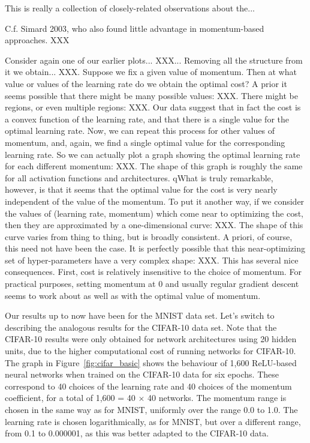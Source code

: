 \documentclass[10pt]{article}
\begin{document}
This is really a collection of closely-related
observations about the...


C.f.  Simard 2003, who also found little advantage in momentum-based
approaches. XXX

Consider again one of our earlier plots... XXX... Removing all the
structure from it we obtain... XXX.  Suppose we fix a given value of
momentum.  Then at what value or values of the learning rate do we
obtain the optimal cost?  A prior it seems possible that there might
be many possible values: XXX.  There might be regions, or even
multiple regions: XXX.  Our data suggest that in fact the cost is a
convex function of the learning rate, and that there is a single value
for the optimal learning rate.  Now, we can repeat this process for
other values of momentum, and, again, we find a single optimal value
for the corresponding learning rate.  So we can actually plot a graph
showing the optimal learning rate for each different momentum: XXX.
The shape of this graph is roughly the same for all activation
functions and architectures. qWhat is truly remarkable, however, is
that it seems that the optimal value for the cost is very nearly
independent of the value of the momentum.  To put it another way, if
we consider the values of (learning rate, momentum) which come near to
optimizing the cost, then they are approximated by a one-dimensional
curve: XXX.  The shape of this curve varies from thing to thing, but
is broadly consistent.  A priori, of course, this need not have been
the case.  It is perfectly possible that this near-optimizing set of
hyper-parameters have a very complex shape: XXX.  This has several
nice consequences.  First, cost is relatively insensitive to the
choice of momentum.  For practical purposes, setting momentum at 0 and
usually regular gradient descent seems to work about as well as with
the optimal value of momentum.

%
%
Our results up to now have been for the MNIST data set.  Let's switch
to describing the analogous results for the CIFAR-10 data set.  Note
that the CIFAR-10 results were only obtained for network architectures
using 20 hidden units, due to the higher computational cost of running
networks for CIFAR-10.  The graph in Figure~\ref{fig:cifar_basic}
shows the behaviour of 1,600 ReLU-based neural networks when trained
on the CIFAR-10 data for six epochs. These correspond to 40 choices of
the learning rate and 40 choices of the momentum coefficient, for a
total of 1,600 = 40 $\times$ 40 networks.  The momentum range is
chosen in the same way as for MNIST, uniformly over the range 0.0 to
1.0.  The learning rate is chosen logarithmically, as for MNIST, but
over a different range, from 0.1 to 0.000001, as this was better
adapted to the CIFAR-10 data.
\end{document}
